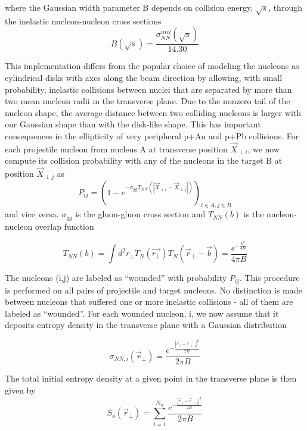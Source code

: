 \documentclass[preprint,showpacs,amsfonts,aps,prl,nofootinbib,floatfix]{revtex4}
\begin{document}
where the Gaussian width parameter B depends on collision energy, $\sqrt{s}$, through the inelastic nucleon-nucleon cross sections
\begin{equation}
	B(\sqrt{s}) = \frac{\sigma_{NN}^{inel}(\sqrt{s})}{14.30}
\end{equation}

This implementation differs from the popular choice of modeling the nucleons as cylindrical disks with axes along the beam direction by allowing, with small probability, inelastic collisions between nuclei that are separated by more than two mean nucleon radii in the transverse plane. Due to the nonzero tail of the nucleon shape, the average distance between two colliding nucleons is larger with our Gaussian shape than with the disk-like shape.  This has important consequences in the ellipticity of very peripheral p+Au and p+Pb collisions. For each projectile nucleon from nucleus A at transverse position $\vec{X}_{\perp i}$, we now compute its collision probability with any of the nucleons in the target B at position  $\vec{X}_{\perp j}$ as
\begin{equation}
	P_{ij} = (1-e^{-\sigma_{gg} T_{NN}(|\vec{X}_{\perp i}-\vec{X}_{\perp j}|)})_{i\in A, j\in B}
	\label{eq:CollisionProb}
\end{equation}
and vice versa. $\sigma_{gg}$ is the gluon-gluon cross section and $T_{NN}(b)$ is the nucleon-nucleon overlap function  \cite{Heinz:2011mh}

\begin{equation}
	\label{eq:NuclearOverlap}
	T_{NN}(b) = \int d^2 r_{\perp} T_{N}(\vec{r_{\perp}}) T_{N}(\vec{r}_{\perp}-\vec{b}) = \frac{e^{-\frac{b^2}{4B}}}{4\pi B}
\end{equation}

The nucleons (i,j) are labeled as “wounded” with probability $P_{ij}$. This procedure is performed on all pairs of projectile and target nucleons. No distinction is made between nucleons that suffered one or more inelastic collisions - all of them are labeled as “wounded”. For each wounded nucleon, i, we now assume that it deposits entropy density in the transverse plane with a Gaussian distribution 

\begin{equation}
	\sigma_{NN,i}(\vec{r}_{\perp}) = \frac{e^{-\frac{|\vec{r}_{\perp}-\vec{r}_{\perp,i}|^2}{2B}}}{2\pi B}
\end{equation}

The total initial entropy density at a given point in the transverse plane is then given by
\begin{equation}
	S_{o}(\vec{r}_{\perp}) = \sum\limits_{i=1}^{N_{w}} \frac{e^{-\frac{|\vec{r}_{\perp}-\vec{r}_{\perp,i}|^2}{2B}}}{2\pi B}
\end{equation}
\end{document}
